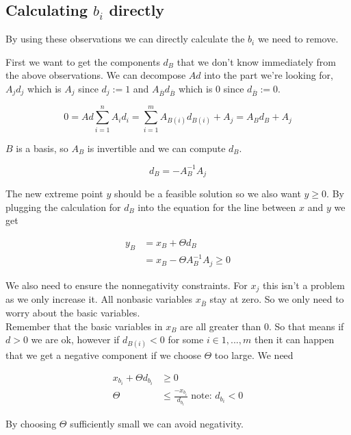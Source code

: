 \subsection{Calculating $b_i$ directly}
By using these observations we can directly calculate the $b_i$ we need to remove.

First we want to get the components $d_B$ that we don't know immediately from the above observations. We can decompose $Ad$ into the part we're looking for, $A_j d_j$ which is $A_j$ since $d_j:=1$ and $A_{\bar B} d_{\bar B}$ which is 0 since $d_{\bar B}:=0$.

\[0= Ad \sum_{i=1}^{n}A_i d_i  = \sum_{i=1}^{m}{A_{B(i)} d_{B(i)}} + A_j = A_B d_B + A_j\]

$B$ is a basis, so $A_B$ is invertible and we can compute $d_B$.

\begin{equation}
d_B = -A^{-1}_B A_j \label{equ:valueDb}
\end{equation}

The new extreme point $y$ should be a feasible solution so we also want $y\geq 0$. By plugging the calculation for $d_B$ into the equation for the line between $x$ and $y$ we get

\begin{align*}
y_B &= x_B + \Theta d_B\\
 &= x_B - \Theta A_B^{-1} A_j \geq 0
\end{align*}

We also need to ensure the nonnegativity constraints. For $x_j$ this isn't a problem as we only increase it. All nonbasic variables $x_{\bar B}$ stay at zero. So we only need to worry about the basic variables. \\ 
Remember that the basic variables in $x_B$ are all greater than 0. 
So that means if $d>0$ we are ok, however if $d_{B(i)} <0$ for some $i \in {1,...,m}$ then it can happen that we get a negative component if we choose $\Theta$ too large. We need 

\begin{center}
\begin{align*}
x_{b_i} +\Theta d_{b_i} & \geq 0\\ %
\Theta &\leq \frac{-x_{b_i}}{d_{b_i}} \text{\ note: }d_{b_i}<0
\end{align*}
\end{center}

By choosing $\Theta$ sufficiently small we can avoid negativity. 

